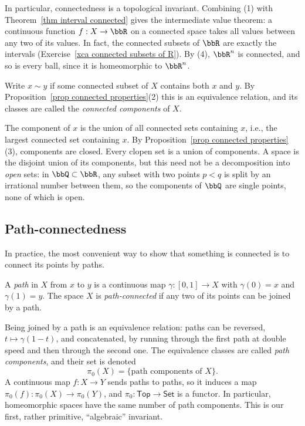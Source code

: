 In particular, connectedness is a topological invariant. Combining (1) with Theorem~\ref{thm interval connected} gives the intermediate value theorem: a continuous function $f:X\to\bbR$ on a connected space takes all values between any two of its values. In fact, the connected subsets of $\bbR$ are exactly the intervals (Exercise~\ref{xca connected subsets of R}). By (4), $\bbR^n$ is connected, and so is every ball, since it is homeomorphic to $\bbR^n$.

\begin{defn}
    Write $x\sim y$ if some connected subset of $X$ contains both $x$ and $y$. By Proposition~\ref{prop connected properties}(2) this is an equivalence relation, and its classes are called the \emph{connected components} of $X$.
\end{defn}

The component of $x$ is the union of all connected sets containing $x$, i.e., the largest connected set containing $x$. By Proposition~\ref{prop connected properties}(3), components are closed. Every clopen set is a union of components. A space is the disjoint union of its components, but this need not be a decomposition into \emph{open} sets: in $\bbQ\subset\bbR$, any subset with two points $p<q$ is split by an irrational number between them, so the components of $\bbQ$ are single points, none of which is open.

\subsection{Path-connectedness}

In practice, the most convenient way to show that something is connected is to connect its points by paths.

\begin{defn}
    A \emph{path} in $X$ from $x$ to $y$ is a continuous map $\gamma:[0,1]\to X$ with $\gamma(0)=x$ and $\gamma(1)=y$. The space $X$ is \emph{path-connected} if any two of its points can be joined by a path.
\end{defn}

Being joined by a path is an equivalence relation: paths can be reversed, $t\mapsto\gamma(1-t)$, and concatenated, by running through the first path at double speed and then through the second one. The equivalence classes are called \emph{path components}, and their set is denoted
\[\pi_0(X)=\{\text{path components of }X\}.\]
A continuous map $f:X\to Y$ sends paths to paths, so it induces a map $\pi_0(f):\pi_0(X)\to\pi_0(Y)$, and $\pi_0:\mathsf{Top}\to\mathsf{Set}$ is a functor. In particular, homeomorphic spaces have the same number of path components. This is our first, rather primitive, ``algebraic'' invariant.


